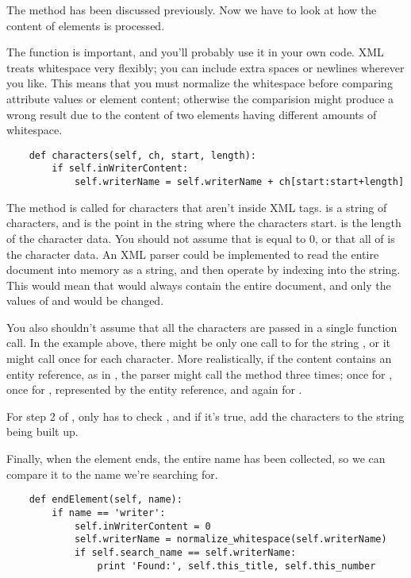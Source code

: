 \documentclass{howto}
\newcommand{\element}[1]{\code{#1}}
\begin{document}
The  method has been discussed previously.  Now
we have to look at how the content of elements is processed.  

The  function is important, and
you'll probably use it in your own code.  XML treats whitespace very
flexibly; you can include extra spaces or newlines wherever you like.
This means that you must normalize the whitespace before comparing
attribute values or element content; otherwise the comparision might
produce a wrong result due to the content of two elements having
different amounts of whitespace.

\begin{verbatim}
    def characters(self, ch, start, length):
        if self.inWriterContent:
            self.writerName = self.writerName + ch[start:start+length]
\end{verbatim}

The  method is called for characters that aren't
inside XML tags.   is a string of characters, and 
is the point in the string where the characters
start.   is the length of the character data.  You should
not assume that  is equal to 0, or that all of  is
the character data.  An XML parser could be implemented to read the
entire document into memory as a string, and then operate by indexing
into the string.   This would mean that  would always contain
the entire document, and only the values of  and
 would be changed.  

You also shouldn't assume that all the characters are passed in a
single function call.  In the example above, there might be only one
call to  for the string , or
it might call  once for each character.  More
realistically, if the content contains an entity reference, as in
, the parser might call the method three times; once for 
, once for \samp{\&}, represented by the entity
reference, and again for .

For step 2 of ,  only has to
check , and if it's true, add the characters to
the string being built up.

Finally, when the \element{writer} element ends, the entire name has
been collected, so we can compare it to the name we're searching for.

\begin{verbatim}
    def endElement(self, name):
        if name == 'writer':
            self.inWriterContent = 0
            self.writerName = normalize_whitespace(self.writerName)
            if self.search_name == self.writerName:
                print 'Found:', self.this_title, self.this_number
\end{verbatim}
\end{document}
